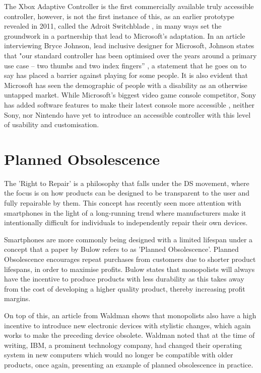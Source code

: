 The Xbox Adaptive Controller is the first commercially available truly accessible controller, however, is not the first instance of this, as an earlier prototype revealed in 2011, called the Adroit Switchblade \cite{ablegamer}, in many ways set the groundwork in a partnership that lead to Microsoft's adaptation.
In an article interviewing Bryce Johnson, lead inclusive designer for Microsoft, Johnson states that "our standard controller has been optimised over the years around a primary use case – two thumbs and two index fingers” \cite{disabilitygaming}, a statement that he goes on to say has placed a barrier against playing for some people.
It is also evident that Microsoft has seen the demographic of people with a disability as an otherwise untapped market.
While Microsoft's biggest video game console competitor, Sony has added software features to make their latest console more accessible \cite{sony}, neither Sony, nor Nintendo have yet to introduce an accessible controller with this level of usability and customisation.


\section{Planned Obsolescence} \label{Planned Obsolescence}

The 'Right to Repair' is a philosophy that falls under the DS movement, where the focus is on how products can be designed to be transparent to the user and fully repairable by them.
This concept has recently seen more attention with smartphones in the light of a long-running trend where manufacturers make it intentionally difficult for individuals to independently repair their own devices.

Smartphones are more commonly being designed with a limited lifespan under a concept that a paper by Bulow \cite{obsolescence} refers to as 'Planned Obsolescence'.
Planned Obsolescence encourages repeat purchases from customers due to shorter product lifespans, in order to maximise profits.
Bulow states that monopolists will always have the incentive to produce products with less durability as this takes away from the cost of developing a higher quality product, thereby increasing profit margins.

On top of this, an article from Waldman \cite{obsolescence2} shows that monopolists also have a high incentive to introduce new electronic devices with stylistic changes, which again works to make the preceding device obsolete.
Waldman noted that at the time of writing, IBM, a prominent technology company, had changed their operating system in new computers which would no longer be compatible with older products, once again, presenting an example of planned obsolescence in practice.

